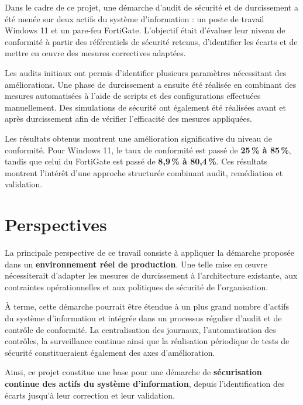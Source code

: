 
Dans le cadre de ce projet, une démarche d'audit de sécurité et de durcissement a été menée sur deux actifs du système d'information : un poste de travail Windows 11 et un pare-feu FortiGate. L'objectif était d'évaluer leur niveau de conformité à partir des référentiels de sécurité retenus, d'identifier les écarts et de mettre en œuvre des mesures correctives adaptées.

Les audits initiaux ont permis d'identifier plusieurs paramètres nécessitant des améliorations. Une phase de durcissement a ensuite été réalisée en combinant des mesures automatisées à l'aide de scripts et des configurations effectuées manuellement. Des simulations de sécurité ont également été réalisées avant et après durcissement afin de vérifier l'efficacité des mesures appliquées.

Les résultats obtenus montrent une amélioration significative du niveau de conformité. Pour Windows 11, le taux de conformité est passé de \textbf{25\,\% à 85\,\%}, tandis que celui du FortiGate est passé de \textbf{8,9\,\% à 80,4\,\%}. Ces résultats montrent l'intérêt d'une approche structurée combinant audit, remédiation et validation.

\section*{Perspectives}

La principale perspective de ce travail consiste à appliquer la démarche proposée dans un \textbf{environnement réel de production}. Une telle mise en œuvre nécessiterait d'adapter les mesures de durcissement à l'architecture existante, aux contraintes opérationnelles et aux politiques de sécurité de l'organisation.

À terme, cette démarche pourrait être étendue à un plus grand nombre d'actifs du système d'information et intégrée dans un processus régulier d'audit et de contrôle de conformité. La centralisation des journaux, l'automatisation des contrôles, la surveillance continue ainsi que la réalisation périodique de tests de sécurité constitueraient également des axes d'amélioration.

Ainsi, ce projet constitue une base pour une démarche de \textbf{sécurisation continue des actifs du système d'information}, depuis l'identification des écarts jusqu'à leur correction et leur validation.
